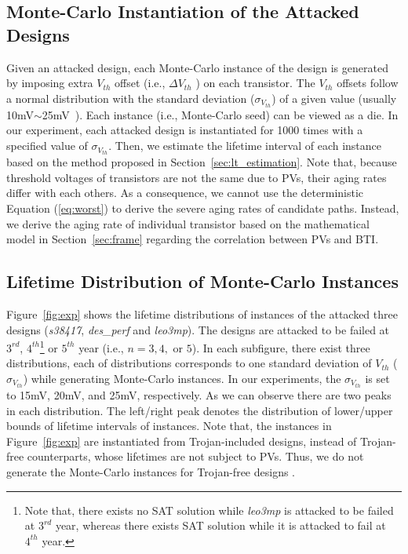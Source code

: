 \subsection{Monte-Carlo Instantiation of the Attacked Designs}
\label{sec:ins:mc_ins}
Given an attacked design, each Monte-Carlo instance of the design is generated by imposing extra $V_{th}$ offset (i.e., $\Delta V_{th}$ ) on each transistor. The $V_{th}$ offsets follow a normal distribution with the standard deviation ($\sigma_{V_{th}}$) of a given value (usually 10mV$\sim$25mV~\cite{han2011statistical}\cite{schlunder2017influence}). Each instance (i.e., Monte-Carlo seed) can be viewed as a die. In our experiment, each attacked design is instantiated for 1000 times with a specified value of $\sigma_{V_{th}}$. 
Then, we estimate the lifetime interval of each instance based on the method proposed in Section~\ref{sec:lt_estimation}. Note that, because threshold voltages of transistors are not the same due to PVs, their aging rates differ with each others. As a consequence, we cannot use the deterministic Equation (\ref{eq:worst}) to derive the severe aging rates of candidate paths. Instead, we derive the aging rate of individual transistor based on the mathematical model in Section~\ref{sec:frame} regarding the correlation between PVs and BTI.

\subsection{Lifetime Distribution of Monte-Carlo Instances}
\label{sec:exp:exp}
Figure~\ref{fig:exp} shows the lifetime distributions of instances of the attacked three designs (\textit{s38417}, \textit{des\_perf} and \textit{leo3mp}). The designs are attacked to be failed at $3^{rd}$, $4^{th}$\footnote{Note that, there exists no SAT solution while \textit{leo3mp} is attacked to be failed at $3^{rd}$ year, whereas there exists SAT solution while it is attacked to fail at $4^{th}$ year.} or $5^{th}$ year (i.e., $n = 3, 4,$ or $5$). In each subfigure, there exist three distributions, each of distributions corresponds to one standard deviation of $V_{th}$ ($\sigma_{V_{th}}$) while generating Monte-Carlo instances. In our experiments, the $\sigma_{V_{th}}$ is set to 15mV, 20mV, and 25mV, respectively. As we can observe there are two peaks in each distribution. The left/right peak denotes the distribution of lower/upper bounds of lifetime intervals of instances. Note that, the instances in Figure~\ref{fig:exp} are instantiated from Trojan-included designs, instead of Trojan-free counterparts, whose lifetimes are not subject to PVs. Thus, we do not generate the Monte-Carlo instances for Trojan-free designs .

